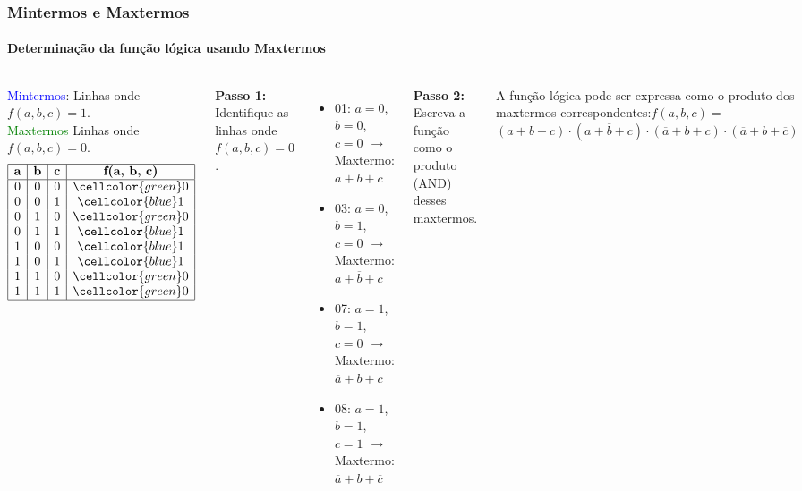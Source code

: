 \begin{frame}
	\frametitle{Mintermos e Maxtermos}
	\framesubtitle{Determinação da função lógica usando Maxtermos}
	\begin{columns}
			\par \textcolor{blue}{Mintermos}: Linhas onde $f(a, b, c) = 1$. \\ \textcolor{green}{Maxtermos} Linhas onde $f(a, b, c) = 0$.
			\[
			\begin{array}{|c|c|c|c|}
				\hline
				\textbf{a} & \textbf{b} & \textbf{c} & \textbf{f(a, b, c)} \\
				\hline
				0 & 0 & 0 & \cellcolor{green} 0 \\
				0 & 0 & 1 & \cellcolor{blue} 1 \\
				0 & 1 & 0 & \cellcolor{green} 0 \\
				0 & 1 & 1 & \cellcolor{blue} 1 \\
				1 & 0 & 0 & \cellcolor{blue} 1 \\
				1 & 0 & 1 & \cellcolor{blue} 1 \\
				1 & 1 & 0 & \cellcolor{green} 0 \\
				1 & 1 & 1 & \cellcolor{green} 0 \\
				\hline
			\end{array}
			\]
			\par \textbf{Passo 1:} Identifique as linhas onde \(f(a, b, c) = 0\).
			\begin{itemize}
				\item 01: \(a = 0\), \(b = 0\), \(c = 0\)  \(\rightarrow\) Maxtermo: \(a + b + c\)
				\item 03: \(a = 0\), \(b = 1\), \(c = 0\)  \(\rightarrow\) Maxtermo: \(a + \overline{b} + c\)
				\item 07: \(a = 1\), \(b = 1\), \(c = 0\)  \(\rightarrow\) Maxtermo: \(\overline{a} + b + c\)
				\item 08: \(a = 1\), \(b = 1\), \(c = 1\)  \(\rightarrow\) Maxtermo: \(\overline{a} + b + \overline{c}\)
			\end{itemize}
			
			\textbf{Passo 2:} Escreva a função como o produto (AND) desses maxtermos.\newline
			
			A função lógica pode ser expressa como o produto dos maxtermos correspondentes:$f(a, b, c) =$ \\ $\boxed{(a + b + c) \cdot (a + \overline{b} + c) \cdot (\overline{a} + b + c) \cdot (\overline{a} + b + \overline{c})}$
		\end{columns}
\end{frame}


